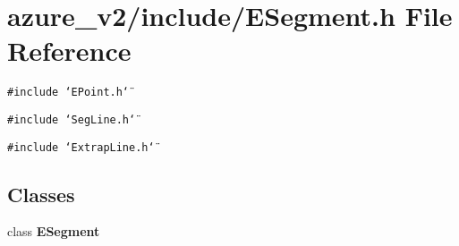\section{azure\_\-v2/include/ESegment.h File Reference}
\label{ESegment_8h}
{\tt \#include \char`\"{}EPoint.h\char`\"{}}\par
{\tt \#include \char`\"{}Seg\-Line.h\char`\"{}}\par
{\tt \#include \char`\"{}Extrap\-Line.h\char`\"{}}\par
\subsection*{Classes}
\begin{CompactItemize}
\item 
class \bf{ESegment}
\end{CompactItemize}
